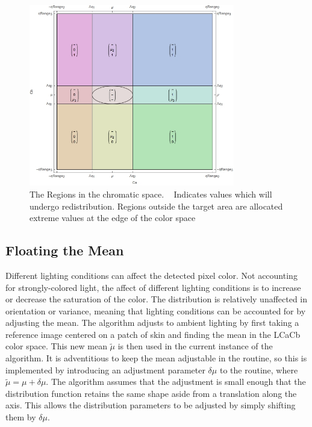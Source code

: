   \begin{figure}[h!]
    \centering
      \includegraphics[width=0.80\textwidth]{Chapter4/Figs/PartitioningRegion.jpg}
      \caption{The Regions in the chromatic space. ~ Indicates values which will undergo redistribution. Regions outside the target area are allocated extreme values at the edge of the color space}  \label{fig:PartitioningRegions}
  \end{figure}
  
  
  
  \subsection{Floating the Mean}\label{sec:FloatingTheMean}
  Different lighting conditions can affect the detected pixel color. Not accounting for strongly-colored light, the affect of different lighting conditions is to increase or decrease the saturation of the color. The distribution is relatively unaffected in orientation or variance, meaning that lighting conditions can be accounted for by adjusting the mean. 
  \newcommand{\newMean}{\widetilde{\mu}}
  The algorithm adjusts to ambient lighting by first taking a reference image centered on a patch of skin and finding the mean in the LCaCb color space. This new mean $\newMean$ is then used in the current instance of the algorithm. It is adventitious to keep the mean adjustable in the routine, so this is implemented by introducing an adjustment parameter $\delta\mu$ to the routine, where $\newMean = \mu + \delta\mu$. The algorithm assumes that the adjustment is small enough that the distribution function retains the same shape aside from a translation along the axis. This allows the distribution parameters to be adjusted by simply shifting them by $\delta\mu$. 
  

